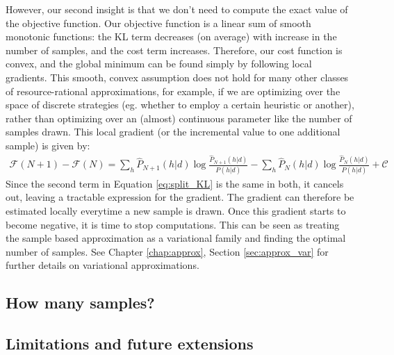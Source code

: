 However, our second insight is that we don't need to compute the exact value of the objective function. Our objective function is a linear sum of smooth monotonic functions: the KL term decreases (on average) with increase in the number of samples, and the cost term increases. Therefore, our cost function is convex, and the global minimum can be found simply by following local gradients. This smooth, convex assumption does not hold for many other classes of resource-rational approximations, for example, if we are optimizing over the space of discrete strategies (eg. whether to employ a certain heuristic or another), rather than optimizing over an (almost) continuous parameter like the number of samples drawn. This local gradient (or the incremental value to one additional sample) is given by:
\begin{align}
\mathcal{F}(N + 1) - \mathcal{F}(N) =  \sum_h \hat{P}_{N+1}(h|d) \log \frac{\hat{P}_{N+1}(h|d)}{P(h|d)} -  \sum_h \hat{P}_N(h|d) \log \frac{\hat{P}_N(h|d)}{P(h|d)} + \mathcal{C}
\end{align}
Since the second term in Equation \ref{eq:split_KL} is the same in both, it cancels out, leaving a tractable expression for the gradient. The gradient can therefore be estimated locally everytime a new sample is drawn. Once this gradient starts to become negative, it is time to stop computations. This can be seen as treating the sample based approximation as a variational family and finding the optimal number of samples\cite{saeedi17}. See Chapter \ref{chap:approx}, Section \ref{sec:approx_var} for further details on variational approximations.

\subsection{How many samples?}

\subsection{Limitations and future extensions}

